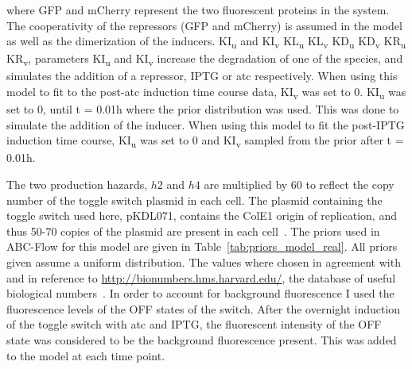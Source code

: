 \noindent where GFP and mCherry represent the two fluorescent proteins in the system. The cooperativity of the repressors (GFP and mCherry) is assumed in the model as well as the dimerization of the inducers. KI\textsubscript{u} and KI\textsubscript{v} KL\textsubscript{u} KL\textsubscript{v} KD\textsubscript{u} KD\textsubscript{v} KR\textsubscript{u} KR\textsubscript{v}, parameters KI\textsubscript{u} and KI\textsubscript{v} increase the degradation of one of the species, and simulates the addition of a repressor, IPTG or \acrshort{atc} respectively. When using this model to fit to the post-\acrshort{atc} induction time course data, KI\textsubscript{v} was set to 0. KI\textsubscript{u} was set to 0, until t = 0.01h where the prior distribution was used. This was done to simulate the addition of the inducer. When using this model to fit the post-IPTG induction time course, KI\textsubscript{u} was set to 0 and KI\textsubscript{v} sampled from the prior after t = 0.01h. 

The two production hazards, $h2$ and $h4$ are multiplied by 60 to reflect the copy number of the toggle switch plasmid in each cell. The plasmid containing the toggle switch used here, pKDL071, contains the ColE1 origin of replication, and thus 50-70 copies of the plasmid are present in each cell~\autocite{Milo:2010cz}. The priors used in ABC-Flow for this model are given in Table~\ref{tab:priors_model_real}. All priors given assume a uniform distribution. The values where chosen in agreement with~\autocite{Lillacci:2013hu} and in reference to \url{http://bionumbers.hms.harvard.edu/}, the database of useful biological numbers~\autocite{Milo:2010cz}. In order to account for background fluorescence I used the fluorescence levels of the OFF states of the switch. After the overnight induction of the toggle switch with \acrshort{atc} and IPTG, the fluorescent intensity of the OFF state was considered to be the background fluorescence present. This was added to the model at each time point. 

